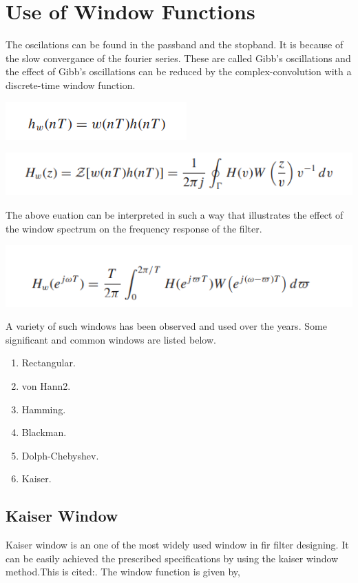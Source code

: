 \documentclass[oneside,11pt,onecolumn,a4paper]{report}
\begin{document}
\section{Use of Window Functions}
\hspace{4em}The oscilations can be found in the passband and the stopband. It is because of the slow convergance of the fourier series. These are called Gibb's oscillations and the effect of Gibb's oscillations\cite{dspdeer} can be reduced by the complex-convolution with a discrete-time window function. 

\includegraphics{Screenshot (171)}

\includegraphics{Screenshot (173)}

The above euation can be interpreted in such a way that illustrates the effect of the window spectrum on the frequency response of the filter.

\includegraphics{Screenshot (168)}

A variety of such windows has been observed and used over the years. Some significant and common windows are listed below.

\begin{enumerate}
  \item Rectangular.
  \item von Hann2.
  \item Hamming.
  \item Blackman.
  \item Dolph-Chebyshev.
  \item Kaiser.
\end{enumerate}

\subsection{Kaiser Window}
\hspace{4em}Kaiser window is an one of the most widely used window in fir filter designing. It can be easily achieved the prescribed specifications by using the kaiser window method.This is cited:\cite{ukessay}. The window function is given by,
\end{document}
